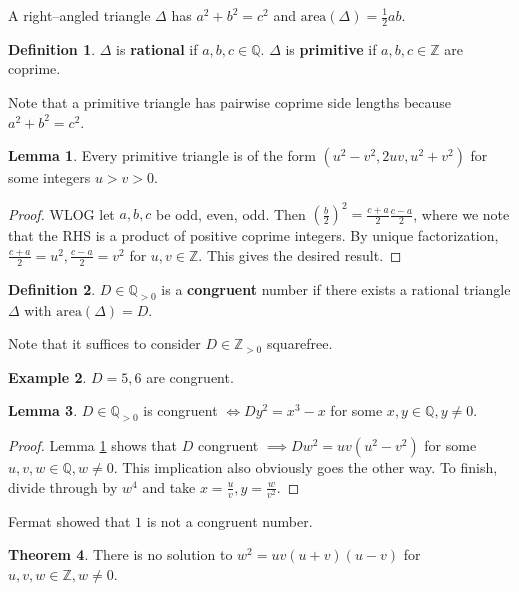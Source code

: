 \documentclass{article}
\theoremstyle{definition}
\newtheorem{theorem}{Theorem}[section]
\newtheorem{lemma}[theorem]{Lemma}
\newtheorem{example}[theorem]{Example}
\newtheorem{defn}{Definition}[section]
\begin{document}
A right--angled triangle $\Delta$ has $a^2+b^2=c^2$ and $\text{area}(\Delta) = \frac{1}{2}ab$.
\begin{defn}
    $\Delta$ is \textbf{rational} if $a,b,c \in \mathbb{Q}$. $\Delta$ is \textbf{primitive} if $a,b,c \in \mathbb{Z}$ are coprime.
\end{defn}
Note that a primitive triangle has pairwise coprime side lengths because $a^2+b^2=c^2$.
\begin{lemma}\label{lemma1.1}
    Every primitive triangle is of the form $(u^2-v^2, 2uv, u^2+v^2)$ for some integers $u > v > 0$.
\end{lemma}
\begin{proof}
    WLOG let $a,b,c$ be odd, even, odd. Then $\left(\frac{b}{2}\right)^2 = \frac{c+a}{2}\frac{c-a}{2}$, where we note that the RHS is a product of positive coprime integers. By unique factorization, $\frac{c+a}{2} = u^2, \frac{c-a}{2}=v^2$ for $u,v \in \mathbb{Z}$. This gives the desired result.
\end{proof}
\begin{defn}
    $D \in \mathbb{Q}_{>0}$ is a \textbf{congruent} number if there exists a rational triangle $\Delta$ with $\text{area}(\Delta)=D$.
\end{defn}
Note that it suffices to consider $D \in \mathbb{Z}_{> 0}$ squarefree.
\begin{example}
    $D=5,6$ are congruent.
\end{example} 
\begin{lemma}\label{lemma1.2}
    $D \in \mathbb{Q}_{>0}$ is congruent $\iff Dy^2 = x^3-x$ for some ${x,y \in \mathbb{Q}, y \neq 0}$.
\end{lemma}
\begin{proof}
    Lemma \ref{lemma1.1} shows that $D$ congruent $\implies Dw^2 = uv(u^2-v^2)$ for some $u,v,w \in \mathbb{Q}, w \neq 0$. This implication also obviously goes the other way. To finish, divide through by $w^4$ and take $x = \frac{u}{v}, y = \frac{w}{v^2}$.
\end{proof}
Fermat showed that $1$ is not a congruent number.
\begin{theorem}\label{theorem1.3}
    There is no solution to $w^2 = uv(u+v)(u-v)$ for $u,v,w \in \mathbb{Z}, w \neq 0$.
\end{theorem}
\end{document}

